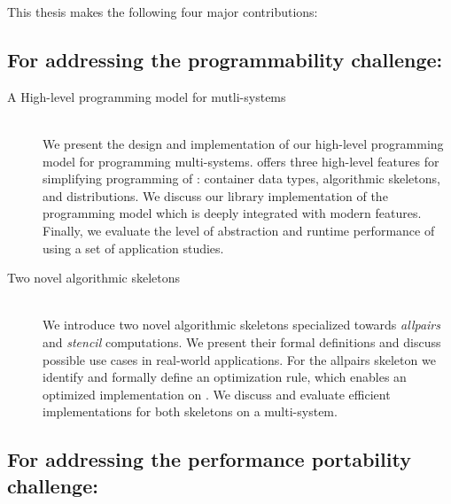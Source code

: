 This thesis makes the following four major contributions:

\subsection*{\hspace{2em}For addressing the programmability challenge:}

\begin{description}
  \item[A High-level programming model for mutli-\GPU systems]\hfill\\[-1em]
    We present the design and implementation of our high-level programming model \SkelCL for programming multi-\GPU systems.
    \SkelCL offers three high-level features for simplifying programming of \GPUs: container data types, algorithmic skeletons, and distributions.
    We discuss our \Cpp library implementation of the \SkelCL programming model which is deeply integrated with modern \Cpp features.
    Finally, we evaluate the level of abstraction and runtime performance of \SkelCL using a set of application studies.

  \item[Two novel algorithmic skeletons]\hfill\\[.25em]
    We introduce two novel algorithmic skeletons specialized towards \emph{allpairs} and \emph{stencil} computations.
    We present their formal definitions and discuss possible use cases in real-world applications.
    For the allpairs skeleton we identify and formally define an optimization rule, which enables an optimized implementation on \GPUs.
    We discuss and evaluate efficient implementations for both skeletons on a multi-\GPU system.
\end{description}

\subsection*{\hspace{2em}For addressing the performance portability challenge:}

